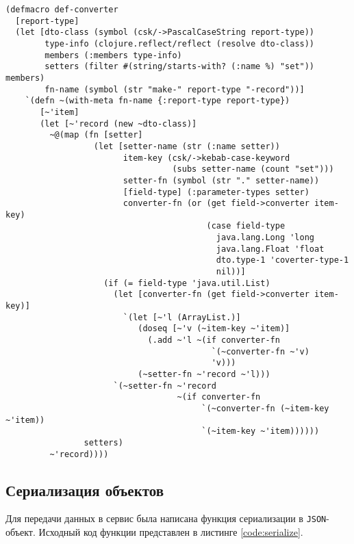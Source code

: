 \clearpage
\begin{lstlisting}[label=code:macro, caption={Макрос конвертации в транспортный объект}]
(defmacro def-converter
  [report-type]
  (let [dto-class (symbol (csk/->PascalCaseString report-type))
        type-info (clojure.reflect/reflect (resolve dto-class))
        members (:members type-info)
        setters (filter #(string/starts-with? (:name %) "set")) members)
        fn-name (symbol (str "make-" report-type "-record"))]
    `(defn ~(with-meta fn-name {:report-type report-type})
       [~'item]
       (let [~'record (new ~dto-class)]
         ~@(map (fn [setter]
                  (let [setter-name (str (:name setter))
                        item-key (csk/->kebab-case-keyword
                                  (subs setter-name (count "set")))
                        setter-fn (symbol (str "." setter-name))
                        [field-type] (:parameter-types setter)
                        converter-fn (or (get field->converter item-key)
                                         (case field-type
                                           java.lang.Long 'long
                                           java.lang.Float 'float
                                           dto.type-1 'coverter-type-1
                                           nil))]
                    (if (= field-type 'java.util.List)
                      (let [converter-fn (get field->converter item-key)]
                        `(let [~'l (ArrayList.)]
                           (doseq [~'v (~item-key ~'item)]
                             (.add ~'l ~(if converter-fn
                                          `(~converter-fn ~'v)
                                          'v)))
                           (~setter-fn ~'record ~'l)))
                      `(~setter-fn ~'record 
                                   ~(if converter-fn
                                        `(~converter-fn (~item-key ~'item))
                                        `(~item-key ~'item))))))
                setters)
         ~'record))))
\end{lstlisting}

\subsection{Сериализация объектов}

Для передачи данных в сервис была написана функция сериализации в \texttt{JSON}-объект. Исходный код функции представлен в листинге \ref{code:serialize}.

